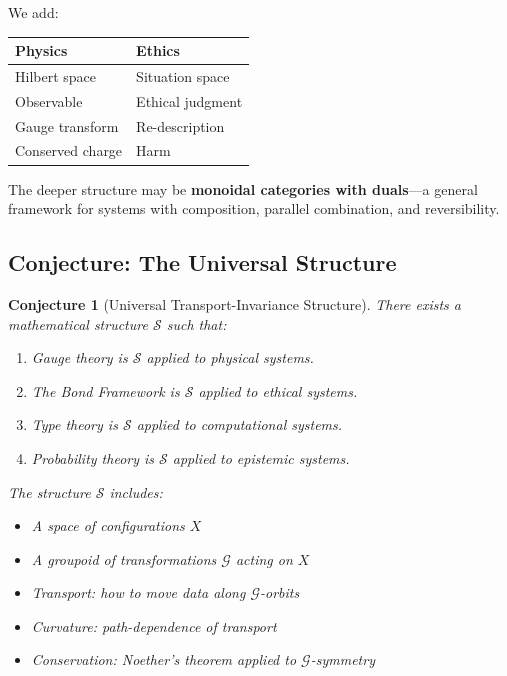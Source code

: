 \documentclass[12pt,letterpaper]{article}
\newtheorem{conjecture}[theorem]{Conjecture}
\theoremstyle{definition}
\theoremstyle{remark}
\newcommand{\G}{\mathcal{G}}
\begin{document}
We add:

\begin{center}
\begin{tabular}{ll}
\toprule
\textbf{Physics} & \textbf{Ethics} \\
\midrule
Hilbert space & Situation space \\
Observable & Ethical judgment \\
Gauge transform & Re-description \\
Conserved charge & Harm \\
\bottomrule
\end{tabular}
\end{center}

The deeper structure may be \textbf{monoidal categories with duals}---a general framework for systems with composition, parallel combination, and reversibility.

\subsection{Conjecture: The Universal Structure}

\begin{conjecture}[Universal Transport-Invariance Structure]
There exists a mathematical structure $\mathcal{S}$ such that:
\begin{enumerate}
    \item Gauge theory is $\mathcal{S}$ applied to physical systems.
    \item The Bond Framework is $\mathcal{S}$ applied to ethical systems.
    \item Type theory is $\mathcal{S}$ applied to computational systems.
    \item Probability theory is $\mathcal{S}$ applied to epistemic systems.
\end{enumerate}
The structure $\mathcal{S}$ includes:
\begin{itemize}
    \item A space of configurations $X$
    \item A groupoid of transformations $\G$ acting on $X$
    \item Transport: how to move data along $\G$-orbits
    \item Curvature: path-dependence of transport
    \item Conservation: Noether's theorem applied to $\G$-symmetry
\end{itemize}
\end{conjecture}
\end{document}

